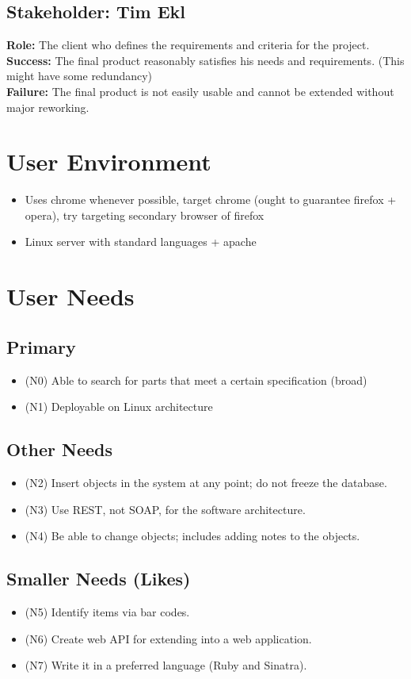 \documentclass{article}
\begin{document}
\subsection{Stakeholder: Tim Ekl}
\textbf{Role:} The client who defines the requirements and criteria for the project.\\
\textbf{Success:} The final product reasonably satisfies his needs and requirements. (This might have some redundancy)\\
\textbf{Failure:} The final product is not easily usable and cannot be extended without major reworking.

\section{User Environment}
\begin{itemize}
\item Uses chrome whenever possible, target chrome (ought to guarantee firefox + opera), try targeting secondary browser of firefox
\item Linux server with standard languages + apache
\end{itemize}

\section{User Needs}
\subsection{Primary}
\begin{itemize}
\item (N0) Able to search for parts that meet a certain specification (broad)
\item (N1) Deployable on Linux architecture
\end{itemize}
\subsection{Other Needs}
\begin{itemize}
\item (N2) Insert objects in the system at any point; do not freeze the database.
\item (N3) Use REST, not SOAP, for the software architecture.
\item (N4) Be able to change objects; includes adding notes to the objects.
\end{itemize}
\subsection{Smaller Needs (Likes)}
\begin{itemize}
\item (N5) Identify items via bar codes.
\item (N6) Create web API for extending into a web application.
\item (N7) Write it in a preferred language (Ruby and Sinatra).
\end{itemize}
\end{document}
